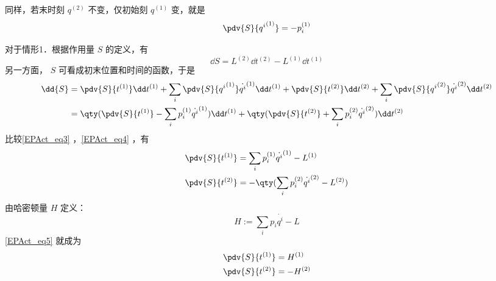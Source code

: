 同样，若末时刻 $q^{(2)}$ 不变，仅初始刻 $q^{(1)}$ 变，就是
\begin{equation}
\pdv{S}{{q^i}^{(1)}}=-p_i^{(1)}
\end{equation}


对于情形1．根据作用量 $S$ 的定义，有
\begin{equation}\label{EPAct_eq3}
\dd{S}=L^{(2)}\dd t^{(2)}-L^{(1)}\dd t^{(1)}
\end{equation}
另一方面， $S$ 可看成初末位置和时间的函数，于是
\begin{equation}\label{EPAct_eq4}
\begin{aligned}
\dd{S}&=\pdv{S}{t^{(1)}}\dd t^{(1)}+\sum_i\pdv{S}{{q^i}^{(1)}}\dot {q^i}^{(1)}\dd t^{(1)}+\pdv{S}{t^{(2)}}\dd t^{(2)}+\sum_i\pdv{S}{{q^i}^{(2)}}\dot {q^i}^{(2)}\dd t^{(2)}\\
&=\qty(\pdv{S}{t^{(1)}}-\sum_i p_i^{(1)}\dot {q^i}^{(1)})\dd t^{(1)}+\qty(\pdv{S}{t^{(2)}}+\sum_i p_i^{(2)}\dot {q^i}^{(2)})\dd t^{(2)}
\end{aligned}
\end{equation}
比较\autoref{EPAct_eq3} ，\autoref{EPAct_eq4} ，有
\begin{equation}\label{EPAct_eq5}
\begin{aligned}
\pdv{S}{t^{(1)}}&=\sum_i p_i^{(1)}\dot {q^i}^{(1)}-L^{(1)}\\
\pdv{S}{t^{(2)}}&=-\qty(\sum_i p_i^{(2)}\dot {q^i}^{(2)}-L^{(2)})
\end{aligned}
\end{equation}
由哈密顿量 $H$ 定义：
\begin{equation}
H:=\sum_i p_i\dot {q^i}-L
\end{equation}
\autoref{EPAct_eq5} 就成为
\begin{equation}
\begin{aligned}
\pdv{S}{t^{(1)}}&=H^{(1)}\\
\pdv{S}{t^{(2)}}&=-H^{(2)}
\end{aligned}
\end{equation}

